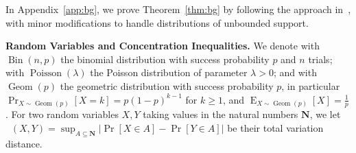 \documentclass[11pt]{article}
\DeclareMathOperator{\geom}{Geom}
\DeclareMathOperator*{\E}{E}
\DeclareMathOperator*{\Bin}{Bin}
\DeclareMathOperator*{\Poisson}{Poisson}
\DeclareMathOperator*{\dTV}{\textit{d}_{TV}}
\begin{document}
In Appendix~\ref{app:bg}, we prove Theorem~\ref{thm:bg} by following the approach in~\cite{bg15}, with  minor modifications  to handle distributions of unbounded support.

\smallskip

{\bf Random Variables and Concentration Inequalities.} We denote with $\Bin(n,p)$ the binomial distribution with success probability $p$ and $n$ trials; with $\Poisson(\lambda)$ the Poisson distribution of parameter $\lambda>0$; and with $\geom(p)$ the geometric distribution with success probability $p$, in particular $\Pr_{X\sim \geom(p)}[X=k]=p(1-p)^{k-1}$ for $k\ge 1$, and $\E_{X\sim\geom(p)}[X]=\frac{1}{p}$. For two random variables $X,Y$ taking values in the natural numbers $\mathbf{N}$, we let $\dTV(X,Y)=\sup_{A\subseteq \mathbf{N}}\left|\Pr[X\in A] - \Pr[Y \in A]\right|$ be their total variation distance. 

\smallskip
\end{document}
